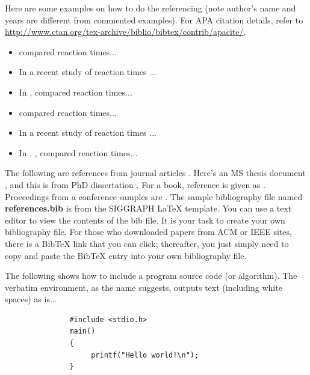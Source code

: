 
Here are some examples on how to do the referencing (note author's name and years are different from commented examples).  
For APA citation details, refer to \url{http://www.ctan.org/tex-archive/biblio/bibtex/contrib/apacite/}. 

\begin{itemize}
 \item {} compared reaction times...
 \item In a recent study of reaction times \cite{kartch:2000:ERA}...
 \item In , \citeauthor{kartch:2000:ERA} compared reaction times...
 \item {} compared reaction times... 
 \item In a recent study of reaction times \cite{fedkiw:2001:VSO}...
 \item In , , compared reaction times...
\end{itemize}

The following are references from journal articles \cite{Park:2006:DSI, Pellacini:2005:LAH, sako:2001:SSB}.
 Here's an MS thesis document \cite{yee:2000:SSA}, and this is from PhD dissertation \cite{kartch:2000:ERA}. 
 For a book, reference is given as  \cite{parke:1996:CFA}. 
 Proceedings from a conference samples are \cite{Jobs95, fedkiw:2001:VSO, levoy:2000:TDM}.  
 The sample bibliography file named \textbf{references.bib} is from the SIGGRAPH \LaTeX{}  template.  
 You can use a text editor to view the contents of the bib file.  
 It is your task to create your own bibliography file.  
 For those who downloaded papers from ACM or IEEE sites, there is a BibTeX link that you can click; thereafter, you just simply need to copy and paste the BibTeX entry into your own bibliography file.

The following shows how to include a program source code (or algorithm).  
The verbatim environment, as the name suggests, outputs text (including white spaces) as is...

\begin{verbatim}
               #include <stdio.h>
               main()
               {
                    printf("Hello world!\n");
               }
\end{verbatim}

